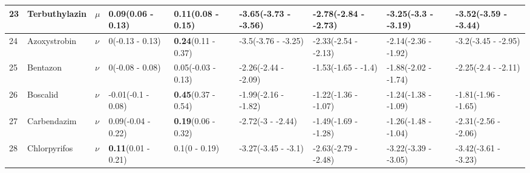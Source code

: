 \begin{longtable}{lp{2cm}p{0.6cm}p{1.8cm}p{1.8cm}p{1.8cm}p{1.8cm}p{1.8cm}p{1.8cm}}
  23 & Terbuthylazin & $\mu$ & \textbf{0.09}\newline (0.06 - 0.13) & \textbf{0.11}\newline (0.08 - 0.15) & -3.65\newline (-3.73 - -3.56) & -2.78\newline (-2.84 - -2.73) & -3.25\newline (-3.3 - -3.19) & -3.52\newline (-3.59 - -3.44) \\ 
   \midrule
24 & Azoxystrobin & $\nu$ & 0\newline (-0.13 - 0.13) & \textbf{0.24}\newline (0.11 - 0.37) & -3.5\newline (-3.76 - -3.25) & -2.33\newline (-2.54 - -2.13) & -2.14\newline (-2.36 - -1.92) & -3.2\newline (-3.45 - -2.95) \\ 
  25 & Bentazon & $\nu$ & 0\newline (-0.08 - 0.08) & 0.05\newline (-0.03 - 0.13) & -2.26\newline (-2.44 - -2.09) & -1.53\newline (-1.65 - -1.4) & -1.88\newline (-2.02 - -1.74) & -2.25\newline (-2.4 - -2.11) \\ 
  26 & Boscalid & $\nu$ & -0.01\newline (-0.1 - 0.08) & \textbf{0.45}\newline (0.37 - 0.54) & -1.99\newline (-2.16 - -1.82) & -1.22\newline (-1.36 - -1.07) & -1.24\newline (-1.38 - -1.09) & -1.81\newline (-1.96 - -1.65) \\ 
  27 & Carbendazim & $\nu$ & 0.09\newline (-0.04 - 0.22) & \textbf{0.19}\newline (0.06 - 0.32) & -2.72\newline (-3 - -2.44) & -1.49\newline (-1.69 - -1.28) & -1.26\newline (-1.48 - -1.04) & -2.31\newline (-2.56 - -2.06) \\ 
  28 & Chlorpyrifos & $\nu$ & \textbf{0.11}\newline (0.01 - 0.21) & 0.1\newline (0 - 0.19) & -3.27\newline (-3.45 - -3.1) & -2.63\newline (-2.79 - -2.48) & -3.22\newline (-3.39 - -3.05) & -3.42\newline (-3.61 - -3.23) \\ 

\end{longtable}
